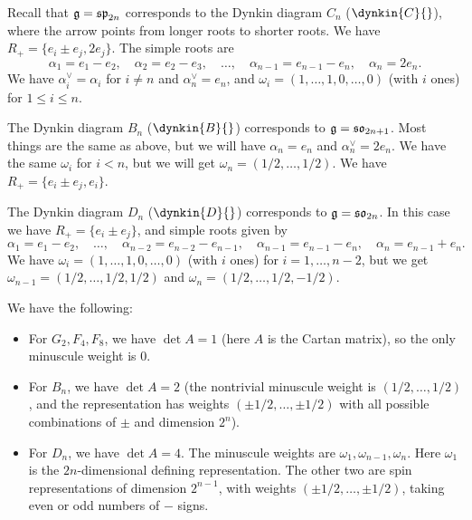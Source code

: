 \begin{example}
  Recall that $\mathfrak{g} = \mathfrak{sp}_{2n}$
  corresponds to the Dynkin
  diagram $C_n$ ($\dynkin{C}{}$),
  where the arrow points from longer
  roots to shorter roots. 
  We have $R_+ = \{e_i \pm e_j, 2 e_j\}$.
  The simple roots are
  \[
    \alpha_1 = e_1 - e_2, \quad
    \alpha_2 = e_2 - e_3, \quad
    \ldots, \quad
    \alpha_{n - 1} = e_{n - 1} - e_n, \quad
    \alpha_n = 2e_n.
  \]
  We have $\alpha_i^\vee = \alpha_i$
  for $i \ne n$ and
  $\alpha_n^\vee = e_n$, and
  $\omega_i = (1, \dots, 1, 0, \dots, 0)$
  (with $i$ ones) for $1 \le i \le n$.
\end{example}

\begin{example}
  The Dynkin diagram $B_n$
  ($\dynkin{B}{}$) corresponds to
  $\mathfrak{g} = \mathfrak{so}_{2n + 1}$.
  Most things are the same
  as above, but we will have
  $\alpha_n = e_n$ and
  $\alpha_n^\vee = 2e_n$. We have
  the same $\omega_i$ for $i < n$,
  but we will get $\omega_n = (1 / 2, \dots, 1 / 2)$.
  We have $R_+ = \{e_i \pm e_j, e_i\}$.
\end{example}

\begin{example}
  The Dynkin diagram
  $D_n$ ($\dynkin{D}{}$)
  corresponds to $\mathfrak{g} = \mathfrak{so}_{2n}$.
  In this case we have
  $R_+ = \{e_i \pm e_j\}$, and simple
  roots given by
  \[
    \alpha_1 = e_1 - e_2, \quad \dots, \quad
    \alpha_{n - 2} = e_{n - 2} - e_{n - 1},
    \quad \alpha_{n - 1} = e_{n - 1} - e_n,
    \quad \alpha_n = e_{n - 1} + e_n.
  \]
  We have $\omega_i = (1, \dots, 1, 0, \dots, 0)$ (with $i$ ones)
  for $i = 1, \dots, n - 2$, but we get
  $\omega_{n - 1} = (1 / 2, \dots, 1 / 2, 1 / 2)$
  and $\omega_n = (1 / 2, \dots, 1 / 2, -1 / 2)$.
\end{example}

\begin{remark}
  We have the following:
  \begin{itemize}
    \item For $G_2, F_4, F_8$, we have
  $\det A = 1$ (here $A$ is the Cartan
  matrix), so the only minuscule
  weight is $0$.

\item For $B_n$, we have
  $\det A = 2$ (the nontrivial minuscule
  weight is $(1 / 2, \dots, 1 / 2)$,
  and the representation has weights
  $(\pm 1 / 2, \dots, \pm 1 / 2)$ with
  all possible combinations of
  $\pm$ and dimension $2^n$).
    \item For $D_n$, we have
      $\det A = 4$. The minuscule
      weights are $\omega_1, \omega_{n - 1}, \omega_n$.
      Here $\omega_1$ is the
      $2n$-dimensional defining
      representation. The other two
      are spin representations of
      dimension $2^{n - 1}$, with
      weights $(\pm 1 / 2, \dots, \pm 1 / 2)$, taking
      even or odd numbers of $-$ signs.
  \end{itemize}
\end{remark}

